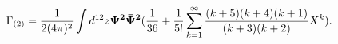 \begin{equation}\label{g2}
\Gamma_{(2)}= {1\over 2(4\pi)^{2}}\int d^{12}z
{\bf\Psi^{2}\bar{\Psi}^{2}} ({1\over 36}  + {1\over
5!}\sum_{k=1}^{\infty}{(k+5)(k+4)(k+1)\over (k+3)(k+2)}X^{k}).
\end{equation}

